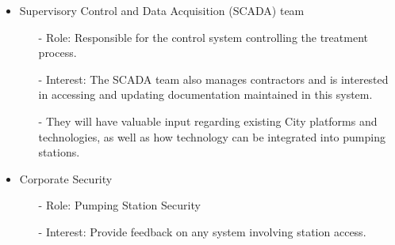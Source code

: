 \documentclass[12pt]{article}
\begin{document}
\begin{itemize}
  \item Supervisory Control and Data Acquisition (SCADA) team
    \begin{itemize}
      \item[-] Role: Responsible for the control system controlling
        the treatment process.
      \item[-] Interest: The SCADA team also manages contractors and is
        interested in accessing and updating documentation maintained
        in this system.
      \item[-] They will have valuable input regarding existing City
        platforms and technologies, as well as how technology can be
        integrated into pumping stations.
    \end{itemize}
  \item Corporate Security

    \begin{itemize}
      \item[-] Role: Pumping Station Security
      \item[-] Interest: Provide feedback on any system involving station
        access.
    \end{itemize}
\end{itemize}
\end{document}
